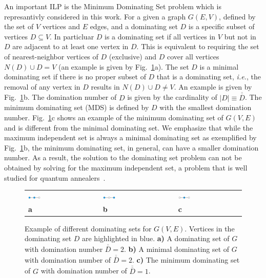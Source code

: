 \documentclass[prd,twocolumn,tightenlines,preprintnumbers,showpacs,superscriptaddress,notitlepage,nofootinbib,eqsecnum,floatfix,longbibliography,aps,10pt]{revtex4-2}
\begin{document}
An important ILP is the Minimum Dominating Set problem which is represantivly considered in this work.
For a given a graph $G(E,V)$, defined by the set of $V$ vertices and $E$ edges, and a dominating set $D$ is a specific subset of vertices $D \subseteq V$.
In particluar $D$ is a dominating set if all vertices in $V$ but not in $D$ are adjacent to at least one vertex in $D$.
This is equivalent to requiring the set of nearest-neighbor vertices of $D$ (exclusive) and $D$ cover all vertices $N(D) \cup D = V$ (an example is given by Fig.~\ref{fig:dominating_sets}a).
The set $D$ is a minimal dominating set if there is no proper subset of $D$ that is a dominating set, {\it{i.e.}}, the removal of any vertex in $D$ results in $N(D) \cup D  \neq V$.
An example is given by Fig.~\ref{fig:dominating_sets}b.
The domination number of $D$ is given by the cardinality of $|D| \equiv \overline{\overline{D}}$.
The minimum dominating set (MDS) is defined by $D$ with the smallest domination number.
Fig.~\ref{fig:dominating_sets}c shows an example of the minimum dominating set of $G(V, E)$ and is different from the minimal dominating set.
We emphasize that while the maximum independent set is always a minimal dominating set as exemplified by Fig.~\ref{fig:dominating_sets}b, the minimum dominating set, in general, can have a smaller domination number.
As a result, the solution to the dominating set problem can not be obtained by solving for the maximum independent set, a problem that is well studied for quantum annealers~\cite{}.

\begin{figure}
	\centering
	\begin{tabular}{p{}p{}p{}p{}p{}}
	\includegraphics[width=0.2\textwidth]{./new_figures/MDS_mds0.pdf}
&&
	\includegraphics[width=0.2\textwidth]{./new_figures/MDS_mds1.pdf}
&&
	\includegraphics[width=0.2\textwidth]{./new_figures/MDS_mds2.pdf}\\
	\centering\bf{a} && \centering\bf{b} && \centering\bf{c}
	\end{tabular}
	\caption{Example of different dominating sets for $G(V, E)$. Vertices in the dominating set $D$ are highlighted in blue. {\bf{a)}} A dominating set of $G$ with domination number $\overline{\overline{D}} = 2$. {\bf{b)}} A minimal dominating set of $G$ with domination number of $\overline{\overline{D}} = 2$. {\bf{c)}} The minimum dominating set of $G$ with domination number of $\overline{\overline{D}} = 1$.}
	\label{fig:dominating_sets}
\end{figure}
\end{document}
